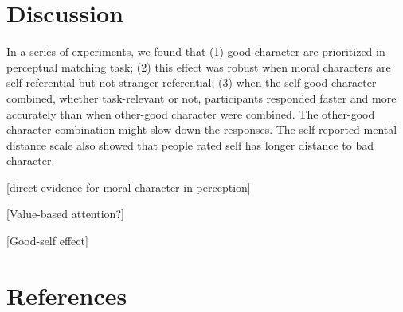 \documentclass[
  english,
  man]{apa6}
\begin{document}
\hypertarget{discussion}{%
\section{Discussion}\label{discussion}}

In a series of experiments, we found that (1) good character are prioritized in perceptual matching task; (2) this effect was robust when moral characters are self-referential but not stranger-referential; (3) when the self-good character combined, whether task-relevant or not, participants responded faster and more accurately than when other-good character were combined. The other-good character combination might slow down the responses. The self-reported mental distance scale also showed that people rated self has longer distance to bad character.

{[}direct evidence for moral character in perception{]}

{[}Value-based attention?{]}

{[}Good-self effect{]}

\hypertarget{references}{%
\section{References}\label{references}}

\begingroup
\setlength{\parindent}{-0.5in}
\setlength{\leftskip}{0.5in}
\end{document}
